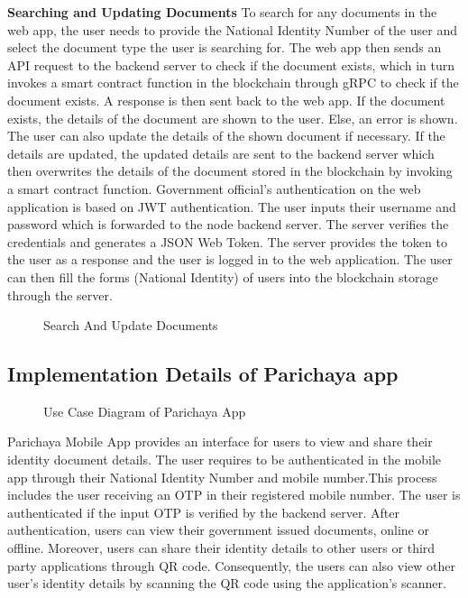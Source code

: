    
\textbf{Searching and Updating Documents}\newline
To search for any documents in the web app, the user needs to provide the National Identity Number of the user and select the document type the user is searching for. The web app then sends an API request to the backend server to check if the document exists, which in turn invokes a smart contract function in the blockchain through gRPC to check if the document exists. A response is then sent back to the web app. If the document exists, the details of the document are shown to the user. Else, an error is shown. The user can also update the details of the shown document if necessary. If the details are updated, the updated details are sent to the backend server which then overwrites the details of the document stored in the blockchain by invoking a smart contract function.\newline
Government official’s authentication on the web application is based on JWT authentication. The user inputs their username and password which is forwarded to the node backend server. The server verifies the credentials and generates a JSON Web Token. The server provides the token to the user as a response and the user is logged in to the web application. The user can then fill the forms (National Identity) of users into the blockchain storage through the server.
\begin{figure}[H]
\centerline{}
\caption{Search And Update Documents}

\label{fig: SearchAndUpdate.svg}
\end{figure}

\subsection{Implementation Details of Parichaya app}
\vspace{15pt}
\begin{figure}[H]
\centerline{}
\caption{Use Case Diagram of Parichaya App}
\label{fig: MobileUsecase.svg}
\end{figure}
Parichaya Mobile App provides an interface for users to view and share their identity document details. The user requires to be authenticated in the mobile app through their National Identity Number and mobile number.This process includes the user receiving an OTP in their registered mobile number. The user is authenticated if the input OTP is verified by the backend server. After authentication, users can view their government issued documents, online or offline. Moreover, users can share their identity details to other users or third party applications through QR code. Consequently, the users can also view other user’s identity details by scanning the QR code using the application’s scanner.\\ \\ 

